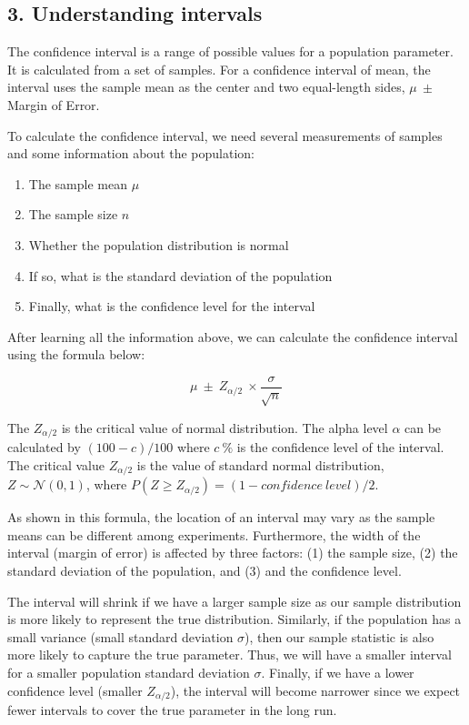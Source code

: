 \documentclass[
]{article}
\providecommand{\tightlist}{%
  \setlength{\itemsep}{0pt}\setlength{\parskip}{0pt}}
\begin{document}
\hypertarget{understanding-intervals}{%
\subsection{3. Understanding intervals}\label{understanding-intervals}}

The confidence interval is a range of possible values for a population
parameter. It is calculated from a set of samples. For a confidence
interval of mean, the interval uses the sample mean as the center and
two equal-length sides, \(\mu\ \pm\) Margin of Error.

To calculate the confidence interval, we need several measurements of
samples and some information about the population:

\begin{enumerate}
\def\labelenumi{\arabic{enumi}.}
\tightlist
\item
  The sample mean \(\mu\)
\item
  The sample size \(n\)
\item
  Whether the population distribution is normal
\item
  If so, what is the standard deviation of the population
\item
  Finally, what is the confidence level for the interval
\end{enumerate}

After learning all the information above, we can calculate the
confidence interval using the formula below:

\[\mu\ \pm\ Z_{\alpha/2}\ \times \frac{\sigma}{\sqrt{n}}\]

The \(Z_{\alpha/2}\) is the critical value of normal distribution. The
alpha level \(\alpha\) can be calculated by \((100 - c) / 100\) where
\(c\ \%\) is the confidence level of the interval. The critical value
\(Z_{\alpha/2}\) is the value of standard normal distribution,
\(Z \sim \mathcal{N}(0, 1)\), where
\(P(Z \geq Z_{\alpha/2}) = (1 - confidence\ level) / 2\).

As shown in this formula, the location of an interval may vary as the
sample means can be different among experiments. Furthermore, the width
of the interval (margin of error) is affected by three factors: (1) the
sample size, (2) the standard deviation of the population, and (3) and
the confidence level.

The interval will shrink if we have a larger sample size as our sample
distribution is more likely to represent the true distribution.
Similarly, if the population has a small variance (small standard
deviation \(\sigma\)), then our sample statistic is also more likely to
capture the true parameter. Thus, we will have a smaller interval for a
smaller population standard deviation \(\sigma\). Finally, if we have a
lower confidence level (smaller \(Z_{\alpha/2}\)), the interval will
become narrower since we expect fewer intervals to cover the true
parameter in the long run.
\end{document}
